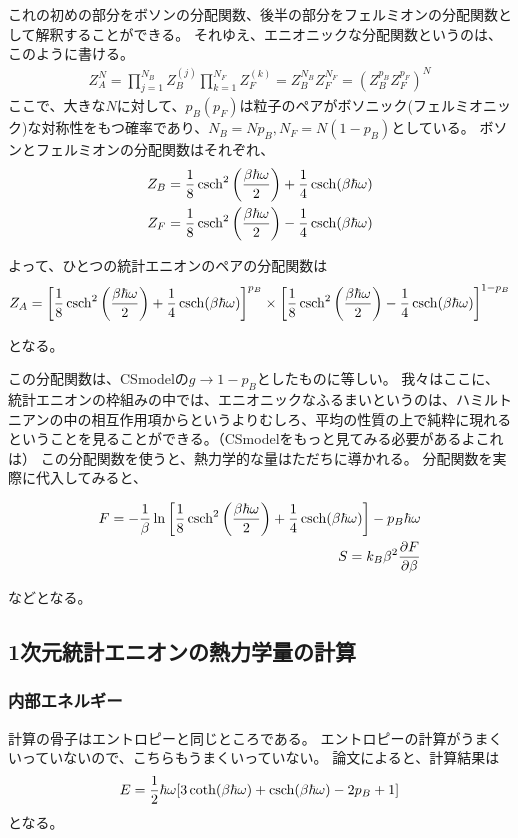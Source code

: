 \documentclass[a4paper,11pt]{jsarticle}
\numberwithin{equation}{section}
\begin{document}
これの初めの部分をボソンの分配関数、後半の部分をフェルミオンの分配関数として解釈することができる。
それゆえ、エニオニックな分配関数というのは、このように書ける。
\begin{align}
  Z_A^N=\prod_{j=1}^{N_B}Z_B^{(j)}\prod_{k=1}^{N_F}Z_F^{(k)}=Z_B^{N_B}Z_F^{N_F}=(Z_B^{p_B}Z_F^{p_F})^N
\end{align}
ここで、大きな$N$に対して、$p_B(p_F)$は粒子のペアがボソニック(フェルミオニック)な対称性をもつ確率であり、$N_B=Np_B,N_F=N(1-p_B)$としている。
ボソンとフェルミオンの分配関数はそれぞれ、
\begin{align}
  Z_B=\frac{1}{8}\csch^2\left(\frac{\beta\hbar\omega}{2}\right)+\frac{1}{4}\csch(\beta\hbar\omega)\\
  Z_F=\frac{1}{8}\csch^2\left(\frac{\beta\hbar\omega}{2}\right)-\frac{1}{4}\csch(\beta\hbar\omega)
\end{align}

よって、ひとつの統計エニオンのペアの分配関数は
\begin{align}
  Z_A=\left[\frac{1}{8}\csch^2\left(\frac{\beta\hbar\omega}{2}\right)+\frac{1}{4}\csch(\beta\hbar\omega)\right]^{p_B}\times\left[\frac{1}{8}\csch^2\left(\frac{\beta\hbar\omega}{2}\right)-\frac{1}{4}\csch(\beta\hbar\omega)\right]^{1-p_B}
\end{align}

となる。

この分配関数は、CSmodelの$g\rightarrow1-p_B$としたものに等しい。
我々はここに、統計エニオンの枠組みの中では、エニオニックなふるまいというのは、ハミルトニアンの中の相互作用項からというよりむしろ、平均の性質の上で純粋に現れるということを見ることができる。（CSmodelをもっと見てみる必要があるよこれは）
この分配関数を使うと、熱力学的な量はただちに導かれる。
分配関数を実際に代入してみると、

\begin{align}
F=-\frac{1}{\beta}\ln\left[\frac{1}{8}\csch^2\left(\frac{\beta\hbar\omega}{2}\right)+\frac{1}{4}\csch(\beta\hbar\omega)\right]-p_B\hbar\omega\\
S=k_B{\beta}^2\frac{\partial F}{\partial\beta}\\
\end{align}

などとなる。

\subsection{1次元統計エニオンの熱力学量の計算}
\subsubsection{内部エネルギー}
計算の骨子はエントロピーと同じところである。
エントロピーの計算がうまくいっていないので、こちらもうまくいっていない。
論文によると、計算結果は
\begin{align}
  E=\frac{1}{2}\hbar \omega[3\coth (\beta\hbar\omega)+\csch(\beta\hbar\omega)-2p_B+1 ]\\
\end{align}
となる。\\
\end{document}
